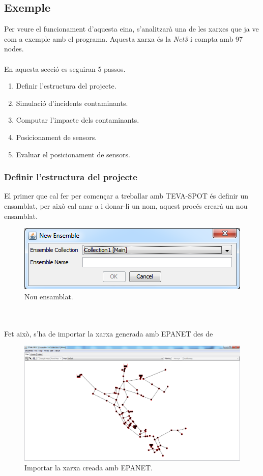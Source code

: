 \documentclass[12pt]{article}
\begin{document}
\subsection{Exemple}
Per veure el funcionament d'aquesta eina, s'analitzarà una de les xarxes que ja ve com a exemple amb el programa. Aquesta xarxa és la \textit{Net3} i compta amb 97 nodes.
\\\\En aquesta secció es seguiran 5 passos.
\begin{enumerate}
	\item Definir l'estructura del projecte.
	\item Simulació d'incidents contaminants.
	\item Computar l'impacte dels contaminants.
	\item Posicionament de sensors.
	\item Evaluar el posicionament de sensors.
\end{enumerate}

\subsubsection{Definir l'estructura del projecte\label{epa_estructura}}
El primer que cal fer per començar a treballar amb TEVA-SPOT és definir un ensamblat, per això cal anar a  i donar-li un nom, aquest procés crearà un nou ensamblat.
\begin{figure}[h!]
	\centering
	\includegraphics[scale=.5]{imatges/teva-spot/1.png}
	\caption{Nou ensamblat.}
\end{figure}
\\\\Fet això, s'ha de importar la xarxa generada amb EPANET des de 
\begin{figure}[h!]
	\includegraphics[scale=.4]{imatges/teva-spot/2.png}
	\caption{Importar la xarxa creada amb EPANET.}
\end{figure}
\end{document}
